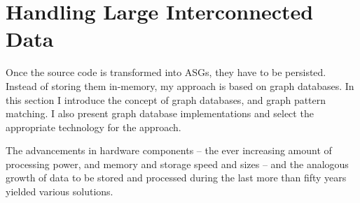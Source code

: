 \FloatBarrier

%
%
%
%
%
%


\section{Handling Large Interconnected Data}
Once the source code is transformed into ASGs, they have to be persisted. Instead of storing them in-memory, my approach is based on graph databases. In this section I introduce the concept of graph databases, and graph pattern matching. I also present graph database implementations and select the appropriate technology for the approach.

The advancements in hardware components -- the ever increasing amount of processing power, and memory and storage speed and sizes -- and the analogous growth of data to be stored and processed during the last more than fifty years yielded various solutions.

